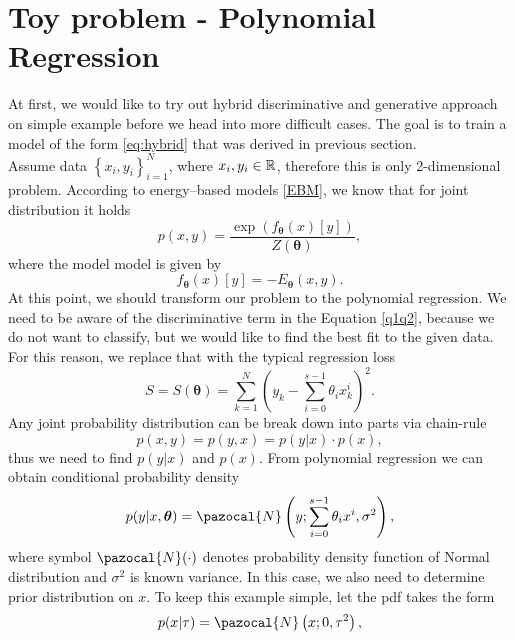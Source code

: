 \section{Toy problem - Polynomial Regression}
At first, we would like to try out hybrid discriminative and generative approach on simple example before we head into more difficult cases. The goal is to train a model of the form \eqref{eq:hybrid} that was derived in previous section.\\
Assume data $\left\lbrace x_i,y_i \right\rbrace_{i=1}^N$, where $x_i,y_i\in \mathbb{R}$, therefore this is only 2-dimensional problem.  According to energy--based models \ref{EBM}, we know that for joint distribution it holds
\begin{equation}
	p(x,y) = \frac{\exp{\left(f_{\boldsymbol{\theta}}(x)[y]\right)}}{Z(\boldsymbol{\theta})},
\end{equation}
where the model model is given by 
\begin{equation}
	f_{\boldsymbol{\theta}}(x)[y] = -E_{\boldsymbol{\theta}}(x,y) .
\end{equation}
At this point, we should transform our problem to the polynomial regression. We need to be aware of the discriminative term in the Equation \eqref{q1q2}, because we do not want to classify, but we would like to find the best fit to the given data. For this reason, we replace that with the typical regression loss
\begin{equation}\label{S(theta)}
	S = S(\boldsymbol{\theta}) = \sum_{k=1}^N \left(y_k - \sum_{i=0}^{s-1} \theta_i x^i_k\right)^2.
\end{equation}	
Any joint probability distribution can be break down into parts via chain-rule 
\begin{equation}\label{eq:chainrule}
	p(x,y) =	p(y,x) = p(y\vert x)\cdot p(x),
\end{equation}
thus we need to find $p(y\vert x)$ and $p(x)$. From polynomial regression we can obtain conditional probability density 
\begin{equation}\label{eq:linregpdf}
	p(y\vert x, \boldsymbol{\theta}) = \pazocal{N}\left(y; \sum_{i=0}^{s-1} \theta_i x^i, \sigma^2 \right),
\end{equation}
where symbol $\pazocal{N}(\cdot)$ denotes probability density function of Normal distribution and $\sigma^2$ is known variance. In this case, we also need to determine prior distribution on $x$. To keep this example simple, let the pdf takes the form
\begin{equation}\label{eq:tauprior}
	p(x|\tau) = \pazocal{N}\left(x; 0, \tau^2\right),
\end{equation}
